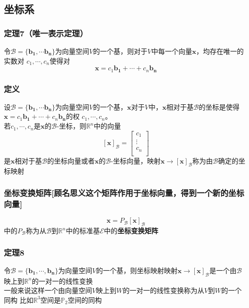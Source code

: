 \documentclass{article}
\newcommand{\ve}{\boldsymbol}
\begin{document}
\begin{CJK}{UTF8}{gkai}
\subsection{坐标系}
\subsubsection{定理7（唯一表示定理）}
令$\mathcal{B}=\{\ve{b_1},\cdots\ve{b_n}\}$为向量空间$V$的一个基，则对于$V$中每一个向量$\ve{x}$，均存在唯一的实数对 $c_1,\cdots,c_n$使得对
\[\ve{x}=c_1\ve{b_1}+\cdots+c_n\ve{b_n}\]

\subsubsection{定义}
设$\mathcal{B}=\{\ve{b_1},\cdots\ve{b_n}\}$为向量空间$V$的一个基，$\ve{x}$对于$V$中，$\ve{x}$相对于基$\mathcal{B}$的坐标是使得$\ve{x}=c_1\ve{b_1}+\cdots+c_n\ve{b_n}$的权 $c_1,\cdots,c_n$。\\
若$c_1,\cdots,c_n$是$\ve{x}$的$\mathcal{B}$-坐标，则$\mathbb{R}^n$中的向量
\[[\ve{x}]_{\mathcal{B}}=
\begin{bmatrix}
    c_1\\
    \vdots\\
    c_n\\
\end{bmatrix}\]
是$\ve{x}$相对于基$\mathcal{B}$的坐标向量或者$\ve{x}$的$\mathcal{B}$-坐标向量，映射$\ve{x}\to [\ve{x}]_{\mathcal{B}}$称为由$\mathcal{B}$确定的坐标映射\\

\subsubsection{坐标变换矩阵[顾名思义这个矩阵作用于坐标向量，得到一个新的坐标向量]}
\[\ve{x}=P_{\mathcal{B}}[\ve{x}]_{\mathcal{B}}\]
中的$P_{\mathcal{B}}$称为从$\mathcal{B}$到$\mathbb{R}^n$中的标准基$\mathcal{E}$中的\textbf{坐标变换矩阵}\\

\subsubsection{定理8}
令$\mathcal{B}=\{\ve{b_1},\cdots,\ve{b_n}\}$为向量空间$V$的一个基，则坐标映射映射$\ve{x}\to [\ve{x}]_{\mathcal{B}}$是一个由$\mathcal{B}$映上到$\mathbb{R}^n$的一对一的线性变换\\

一般来说这样一个由向量空间$V$映上到$W$的一对一的线性变换称为从$V$到$W$的一个同构
比如$\mathbb{R}^3$空间是$\mathbb{P}_2$空间的同构\\

\end{CJK}
\end{document}
